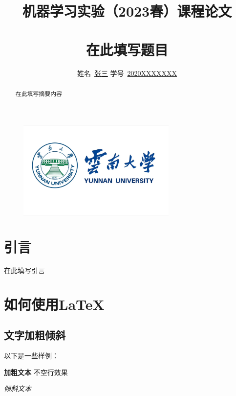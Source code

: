 \documentclass[hyperref,a4paper,UTF8]{ctexart}
\title{
机器学习实验（2023春）课程论文\\
~\\
\textbf{在此填写题目}
}
\author{
\kaishu\normalsize
姓名\ \underline{张三} \qquad
学号\ \underline{2020XXXXXXX} \qquad
}
\date{} %
\begin{document}
\begin{figure}
    \centering
    \includegraphics[width=0.7\textwidth]{fig/ynu.jpg}
\end{figure}

\maketitle



\begin{abstract}

    在此填写摘要内容

\end{abstract}
\thispagestyle{empty} %

\newpage

\tableofcontents
\thispagestyle{empty} %

\newpage

\listoffigures
\listoftables


\thispagestyle{empty} %
\newpage


\section{引言}

在此填写引言


\section{如何使用\LaTeX }

\subsection{文字加粗倾斜}

以下是一些样例：

\textbf{加粗文本}
不空行效果


\textit{倾斜文本}
\end{document}
